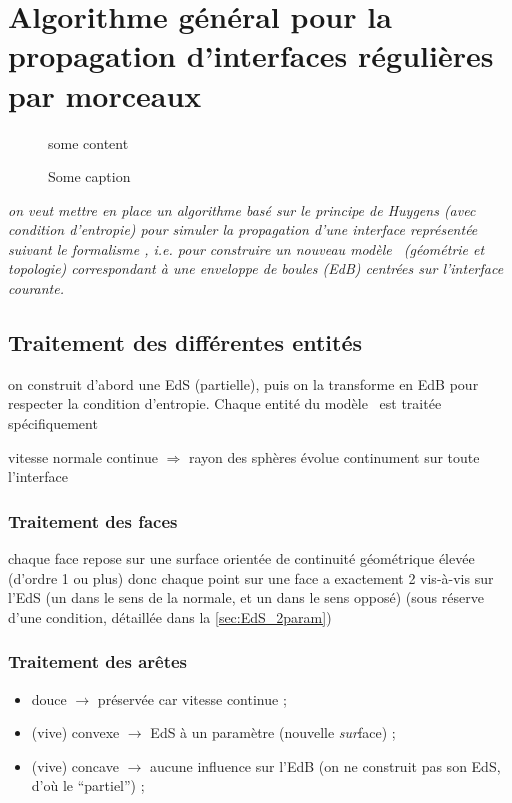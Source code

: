 \chapter[Algorithme de propagation d'interfaces régulières par morceaux]{Algorithme général pour la propagation d'interfaces régulières par morceaux}
\label{chap:algo_general}


\begin{figure}
\centering
some content
\caption{Some caption}
\label{fig:some_figure}
\end{figure}


\textit{on veut mettre en place un algorithme basé sur le principe de Huygens (avec condition d'entropie) pour simuler la propagation d'une interface représentée suivant le formalisme \brep, i.e. pour construire un nouveau modèle \brep\ (géométrie et topologie) correspondant à une enveloppe de boules (EdB) centrées sur l'interface courante.}


\section{Traitement des différentes entités \brep}
on construit d'abord une EdS (partielle), puis on la transforme en EdB pour respecter la condition d'entropie. Chaque entité du modèle \brep\ est traitée spécifiquement

vitesse normale continue $\Rightarrow$ rayon des sphères évolue continument 
sur toute l'interface
\subsection{Traitement des faces}
chaque face repose sur une surface orientée de continuité géométrique élevée (d'ordre 1 ou plus) donc chaque point sur une face a exactement 2 vis-à-vis sur l'EdS (un dans le sens de la normale, et un dans le sens opposé) (sous réserve d'une condition, détaillée dans la \autoref{sec:EdS_2param})


\subsection{Traitement des arêtes}
\begin{itemize}
	\item douce $\to$ préservée car vitesse continue ;
	\item (vive) convexe $\to$ EdS à un paramètre (nouvelle \textit{sur}face) ;
	\item (vive) concave $\to$ aucune influence sur l'EdB (on ne construit pas son EdS, d'où le ``partiel'') ;
\end{itemize}

